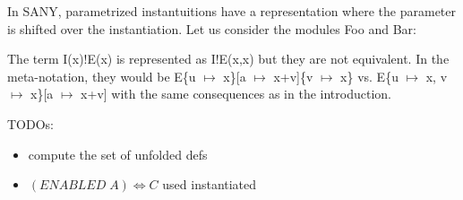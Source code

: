 \documentclass[a4paper]{article}
\newcommand{\tla}[1]{#1}
\begin{document}
In SANY, parametrized instantuitions have a representation where the
 parameter is shifted over the instantiation. Let us consider the
 modules Foo and Bar:

\begin{parcolumns}{2}
\end{parcolumns}

The term \tla{I(x)!E(x)} is represented as \tla{I!E(x,x)} but they are
 not equivalent. In the meta-notation, they would be
 E\{u $\mapsto$ x\}[a $\mapsto$ x+v]\{v $\mapsto$ x\} vs. E\{u $\mapsto$ x,
 v $\mapsto$ x\}[a $\mapsto$ x+v] with the same consequences as in the
 introduction.


TODOs:\\
\begin{itemize}
\item  compute the set of unfolded defs
\item  $(ENABLED\; A) \Leftrightarrow  C$ used instantiated
\end{itemize}
\end{document}
